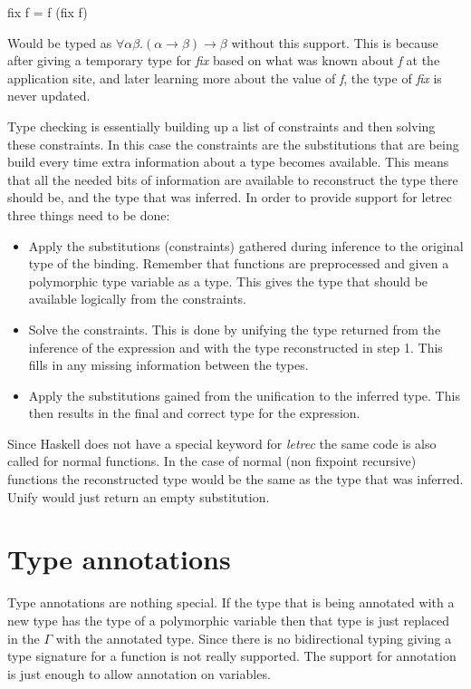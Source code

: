 \begin{code}
fix f = f (fix f)
\end{code} 

Would be typed as $\forall \alpha \beta. (\alpha \rightarrow \beta) \rightarrow \beta$ without this support. This is because after giving a temporary type for \emph{fix} based on what was known about \emph{f} at the application site, and later learning more about the value of \emph{f}, the type of \emph{fix} is never updated.

Type checking is essentially building up a list of constraints and then solving these constraints. In this case the constraints are the substitutions that are being build every time extra information about a type becomes available.
This means that all the needed bits of information are available to reconstruct the type there should be, and the type that was inferred. In order to provide support for letrec three things need to be done:

\begin{itemize}
\item Apply the substitutions (constraints) gathered during inference to the original type of the binding. Remember that functions are preprocessed and given a polymorphic type variable as a type. This gives the type that should be available logically from the constraints.
\item Solve the constraints. This is done by unifying the type returned from the inference of the expression and with the type reconstructed in step 1. This fills in any missing information between the types.
\item Apply the substitutions gained from the unification to the inferred type. This then results in the final and correct type for the expression.
\end{itemize}
Since Haskell does not have a special keyword for \emph{letrec} the same code is also called for normal functions. In the case of normal (non fixpoint recursive) functions the reconstructed type would be the same as the type that was inferred. Unify would just return an empty substitution.

\section{Type annotations}
Type annotations are nothing special. If the type that is being annotated with a new type has the type of a polymorphic variable then that type is just replaced in the $\Gamma$ with the annotated type. Since there is no bidirectional typing giving a type signature for a function is not really supported. The support for annotation is just enough to allow annotation on variables.
